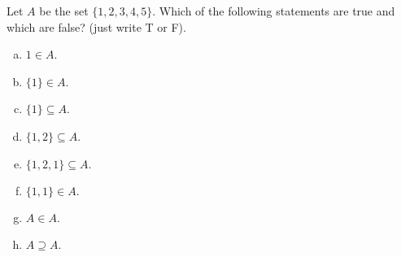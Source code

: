 Let $A$ be the set $\{1,2,3,4,5\}$. Which of the following statements are true and which are false? (just write T or F).
\begin{multicols}{2}
\begin{enumerate}[(a)]
\item $1\in A$. 
\item $\{1\}\in A$.
\item $\{1\}\subseteq A$.
\item $\{1,2\}\subseteq A$.
\item $\{1,2,1\}\subseteq A.$
\item $\{1,1\}\in A.$
\item $A\in A$.
\item $A\supseteq A$.
\end{enumerate}
\end{multicols}
